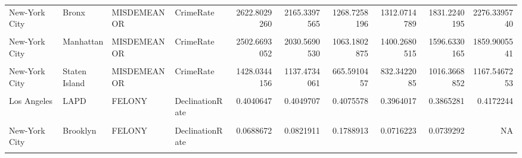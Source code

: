 \documentclass{article}
\begin{document}
\begin{table}[!h]
\begin{tabular}{llllrrrrrr}
New-York City & Bronx & MISDEMEANOR & CrimeRate & 2622.8029260 & 2165.3397565 & 1268.7258196 & 1312.0714789 & 1831.2240195 & 2276.3395740\\
\addlinespace
\cellcolor{gray!6}{New-York City} & \cellcolor{gray!6}{Brooklyn} & \cellcolor{gray!6}{MISDEMEANOR} & \cellcolor{gray!6}{CrimeRate} & \cellcolor{gray!6}{1511.0944197} & \cellcolor{gray!6}{1196.1390725} & \cellcolor{gray!6}{650.0770477} & \cellcolor{gray!6}{763.2922114} & \cellcolor{gray!6}{982.8806838} & \cellcolor{gray!6}{1255.2196703}\\
New-York City & Manhattan & MISDEMEANOR & CrimeRate & 2502.6693052 & 2030.5690530 & 1063.1802875 & 1400.2680515 & 1596.6330165 & 1859.9005541\\
\cellcolor{gray!6}{New-York City} & \cellcolor{gray!6}{Queens} & \cellcolor{gray!6}{MISDEMEANOR} & \cellcolor{gray!6}{CrimeRate} & \cellcolor{gray!6}{1344.6364176} & \cellcolor{gray!6}{1188.7173016} & \cellcolor{gray!6}{656.4207925} & \cellcolor{gray!6}{756.1159086} & \cellcolor{gray!6}{890.5193548} & \cellcolor{gray!6}{1155.0504485}\\
New-York City & Staten Island & MISDEMEANOR & CrimeRate & 1428.0344156 & 1137.4734061 & 665.5910457 & 832.3422085 & 1016.3668852 & 1167.5467253\\
\cellcolor{gray!6}{Los Angeles} & \cellcolor{gray!6}{LASD} & \cellcolor{gray!6}{FELONY} & \cellcolor{gray!6}{DeclinationRate} & \cellcolor{gray!6}{0.2630699} & \cellcolor{gray!6}{0.2533409} & \cellcolor{gray!6}{0.2940041} & \cellcolor{gray!6}{0.3284672} & \cellcolor{gray!6}{0.3510897} & \cellcolor{gray!6}{0.3856455}\\
\addlinespace
Los Angeles & LAPD & FELONY & DeclinationRate & 0.4040647 & 0.4049707 & 0.4075578 & 0.3964017 & 0.3865281 & 0.4172244\\
\cellcolor{gray!6}{New-York City} & \cellcolor{gray!6}{Bronx} & \cellcolor{gray!6}{FELONY} & \cellcolor{gray!6}{DeclinationRate} & \cellcolor{gray!6}{0.1752330} & \cellcolor{gray!6}{0.1786121} & \cellcolor{gray!6}{0.2931680} & \cellcolor{gray!6}{0.2414116} & \cellcolor{gray!6}{0.2673274} & \cellcolor{gray!6}{NA}\\
New-York City & Brooklyn & FELONY & DeclinationRate & 0.0688672 & 0.0821911 & 0.1788913 & 0.0716223 & 0.0739292 & NA\\
\cellcolor{gray!6}{New-York City} & \cellcolor{gray!6}{Manhattan} & \cellcolor{gray!6}{FELONY} & \cellcolor{gray!6}{DeclinationRate} & \cellcolor{gray!6}{0.0368619} & \cellcolor{gray!6}{0.0464765} & \cellcolor{gray!6}{0.1251845} & \cellcolor{gray!6}{0.0648686} & \cellcolor{gray!6}{0.0691184} & \cellcolor{gray!6}{NA}\\

\end{tabular}
\end{table}
\end{document}
